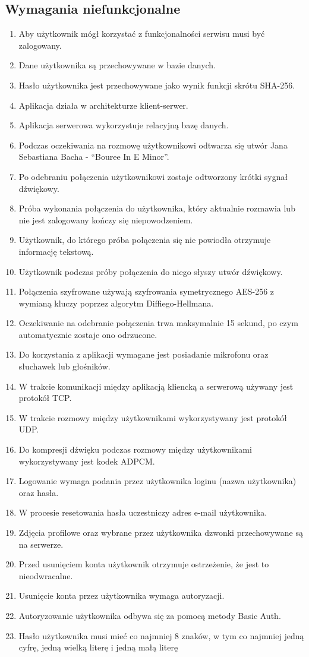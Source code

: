 \documentclass{article}
\begin{document}
  \subsection{Wymagania niefunkcjonalne}
  \begin{enumerate}
    \item Aby użytkownik mógł korzystać z funkcjonalności serwisu musi być zalogowany.
    \item Dane użytkownika są przechowywane w bazie danych.
    \item Hasło użytkownika jest przechowywane jako wynik funkcji skrótu SHA-256.
    \item Aplikacja działa w architekturze klient-serwer.
    \item Aplikacja serwerowa wykorzystuje relacyjną bazę danych.
    \item Podczas oczekiwania na rozmowę użytkownikowi odtwarza się utwór Jana Sebastiana Bacha - “Bouree In E Minor”.
    \item Po odebraniu połączenia użytkownikowi zostaje odtworzony krótki sygnał dźwiękowy.
    \item Próba wykonania połączenia do użytkownika, który aktualnie rozmawia lub nie jest zalogowany kończy się niepowodzeniem.
    \item Użytkownik, do którego próba połączenia się nie powiodła otrzymuje informację tekstową.
    \item Użytkownik podczas próby połączenia do niego słyszy utwór dźwiękowy.
    \item Połączenia szyfrowane używają szyfrowania symetrycznego AES-256 z wymianą kluczy poprzez algorytm Diffiego-Hellmana.
    \item Oczekiwanie na odebranie połączenia trwa maksymalnie 15 sekund, po czym automatycznie zostaje ono odrzucone.
    \item Do korzystania z aplikacji wymagane jest posiadanie mikrofonu oraz słuchawek lub głośników.
    \item W trakcie komunikacji między aplikacją kliencką a serwerową używany jest protokół TCP.
    \item W trakcie rozmowy między użytkownikami wykorzystywany jest protokół UDP.
    \item Do kompresji dźwięku podczas rozmowy między użytkownikami wykorzystywany jest kodek ADPCM.
    \item Logowanie wymaga podania przez użytkownika loginu (nazwa użytkownika) oraz hasła.
    \item W procesie resetowania hasła uczestniczy adres e-mail użytkownika.
    \item Zdjęcia profilowe oraz wybrane przez użytkownika dzwonki przechowywane są na serwerze.
    \item Przed usunięciem konta użytkownik otrzymuje ostrzeżenie, że jest to nieodwracalne.
    \item Usunięcie konta przez użytkownika wymaga autoryzacji.
    \item Autoryzowanie użytkownika odbywa się za pomocą metody Basic Auth.
    \item Hasło użytkownika musi mieć co najmniej 8 znaków, w tym co najmniej jedną cyfrę, jedną wielką literę i jedną małą literę
  \end{enumerate}
\end{document}
